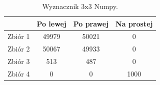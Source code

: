 \documentclass[11pt]{scrartcl}
\begin{document}
    \begin{table}[H]
        \centering
        \renewcommand{\arraystretch}{1.5}
        \begin{tabular}{| c | c | c | c |}
            \hline
            & Po lewej & Po prawej & Na prostej \\
            \hline
            Zbiór 1 & 49979 & 50021 & 0 \\
            \hline
            Zbiór 2 & 50067 & 49933 & 0 \\
            \hline
            Zbiór 3 & 513 & 487 & 0 \\
            \hline
            Zbiór 4 & 0 & 0 & 1000 \\
            \hline
        \end{tabular}
        \renewcommand{\arraystretch}{1.5}
        \caption{Wyznacznik 3x3 Numpy.}
    \end{table}
\end{document}
